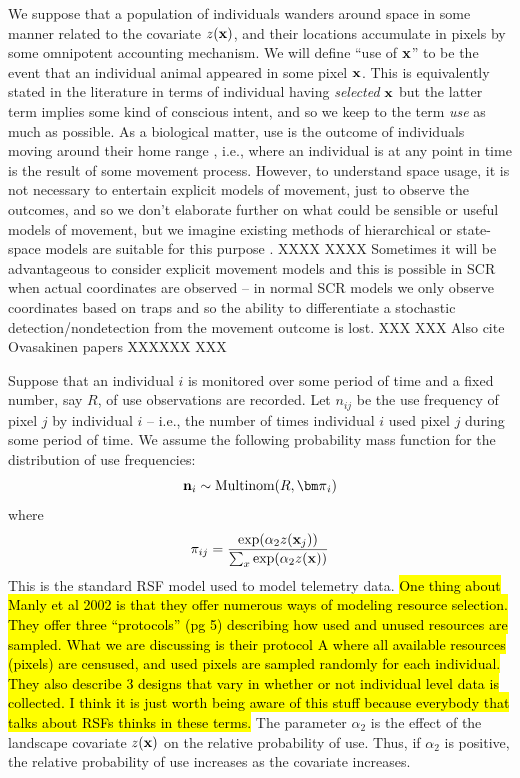 We suppose that a population of individuals wanders around space in
some manner related to the covariate $z({\bf x})$, and their locations
accumulate in pixels by some omnipotent accounting mechanism. We will
define ``use of ${\bf x}$'' to be the event that an individual animal
appeared in some pixel ${\bf x}$. This is equivalently stated in the
literature in terms of individual having {\it selected} ${\bf x}$ but
the latter term implies some kind of conscious intent, and so we keep
to the term {\it use} as much as possible.  As a biological matter,
use is the outcome of individuals moving around their home range \citep{hooten_etal:2010},
i.e., where an individual is at any point in time is the result of
some movement process. However, to understand space usage, it is not
necessary to entertain explicit models of movement, just to observe
the outcomes, and so we don't elaborate further on what could be
sensible or useful models of movement, but we imagine existing methods
of hierarchical or state-space
models are suitable for this purpose \citep{jonsen_etal:2005,
  forester_etal:2007, patterson_etal:2008, hooten_etal:2010,
  mcclintock_etal:2012}.
XXXX
XXXX
Sometimes it will be advantageous to consider explicit movement models
and this is possible in SCR when actual coordinates are observed -- in
normal SCR models we only observe coordinates based on traps and so
the ability to differentiate a stochastic detection/nondetection from
the movement outcome is lost.
XXX 
XXX Also cite Ovasakinen papers XXXXXX
XXX

Suppose that an individual $i$ is monitored over some period of time
and a fixed number, say $R$, of use observations are recorded.
Let $n_{ij}$ be the use frequency of pixel $j$ by individual $i$ --
i.e.,
the number of times individual $i$ used pixel $j$
during some period of time.  We assume the
following probability mass function for the distribution of use
frequencies:
\[
{\bf n}_{i} \sim \mbox{Multinom}(R, {\bm \pi}_{i})
\]
where
\[
 \pi_{ij} = \frac{ \exp( \alpha_{2} z({\bf x}_{j}) ) }{ \sum_{x}
   \exp(\alpha_{2} z({\bf x}))}
\]
This is the standard RSF model \citep{manly_etal:2002} used to model
telemetry data.
\hl{One thing about Manly et al 2002 is that they offer
  numerous ways of modeling resource selection. They offer three
  ``protocols'' (pg 5) describing how used and unused resources are
  sampled. What we are discussing is their protocol A where all
  available resources (pixels) are censused, and used pixels are
  sampled randomly for each individual. They also describe 3 designs
  that vary in whether or not individual level data is collected. I
  think it is just worth being aware of this stuff because everybody
  that talks about RSFs thinks in these terms.}
The parameter $\alpha_2$ is the effect of the
landscape covariate $z({\bf x})$ on the relative probability of
use. Thus, if $\alpha_2$ is positive, the relative probability of use
increases as the covariate increases.

